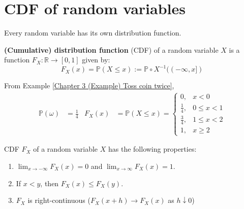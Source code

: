 \documentclass{huhtakm-template-book}
\newcommand{\prob}{\mathbb{P}}
\begin{document}
\section{CDF of random variables}
Every random variable has its own distribution function.
\begin{defn}
	\textbf{(Cumulative) distribution function} (CDF) of a random variable $X$ is a function $F_{X}:\mathbb{R}\to [0,1]$ given by:
	\begin{equation*}
		F_{X}(x)=\prob(X\leq x):=\prob\circ X^{-1}((-\infty,x])
	\end{equation*}
\end{defn}
\begin{eg}
	From Example \ref{Chapter 3 (Example) Toss coin twice},
	\begin{align*}
		\prob(\omega)&=\frac{1}{4} & F_{X}(x)&=\prob(X\leq x)=\begin{cases}
			0, &x<0\\
			\frac{1}{4}, &0\leq x<1\\
			\frac{3}{4}, &1\leq x<2\\
			1, &x\geq 2
		\end{cases}
	\end{align*}
\end{eg}
\begin{lem}
	CDF $F_{X}$ of a random variable $X$ has the following properties:
	\begin{enumerate}
		\item $\lim_{x\to -\infty}F_{X}(x)=0$ and $\lim_{x\to\infty}F_{X}(x)=1$.
		\item If $x<y$, then $F_{X}(x)\leq F_{X}(y)$.
		\item $F_{X}$ is right-continuous ($F_{X}(x+h)\to F_{X}(x)$ as $h\downarrow 0$)
	\end{enumerate}
\end{lem}
\end{document}
